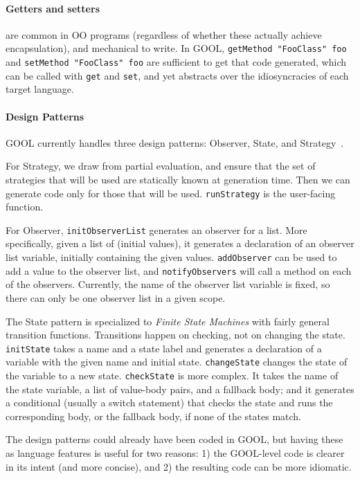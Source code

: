 \documentclass[sigplan,review,prologue,dvipsnames]{acmart}
\begin{document}
\paragraph{Getters and setters} are common in OO programs (regardless of
whether these actually achieve encapsulation), and mechanical to write.
In GOOL, \verb|getMethod "FooClass" foo| and \verb|setMethod "FooClass" foo|
are sufficient to get that code generated, which can be called with
\verb|get| and \verb|set|, and yet abstracts over the idiosyncracies of
each target language.

\paragraph{Design Patterns}
GOOL currently handles three design patterns: Observer,
State, and Strategy~\cite{gamma1995design}. 

For Strategy, we draw from partial evaluation, and ensure that the set of
strategies that will be used are statically known at generation
time.  Then we can generate code only for those that will
be used.  \verb|runStrategy| is the user-facing function.

For Observer, \verb|initObserverList| generates an observer for a list.  More
specifically, given a list of (initial values), it generates a declaration of
an observer list variable, initially containing the given values.
\verb|addObserver| can be used to add a value to the observer list, and
\verb|notifyObservers| will call a method on each of the observers. Currently,
the name of the observer list variable is fixed, so there can only be one
observer list in a given scope.

The State pattern is specialized to \emph{Finite State Machines}
with fairly general transition functions.  Transitions happen on checking, not
on changing the state. \verb|initState| takes a name and a state label and
generates a declaration of a variable with the given name and initial state.
\verb|changeState| changes the state of the variable to a new state.
\verb|checkState| is more complex.  It takes the name of the state variable, a
list of value-body pairs, and a fallback body; and it generates a conditional
(usually a switch statement) that checks the state and runs the corresponding
body, or the fallback body, if none of the states match.

The design patterns could already have been coded in GOOL, but
having these as language features is useful for two reasons: 1) the GOOL-level
code is clearer in its intent (and more concise), and 2) the resulting code
can be more idiomatic.
\end{document}
